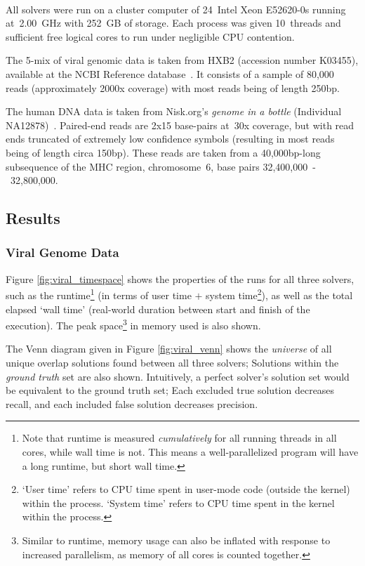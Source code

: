 All solvers were run on a cluster computer of 24~Intel\textsuperscript{\textregistered} Xeon\textsuperscript{\textregistered} E52620-0s running at~2.00~GHz with 252~GB of storage. Each process was given 10~threads and sufficient free logical cores to run under negligible CPU contention.

The 5-mix of viral genomic data is taken from HXB2 (accession number K03455), available at the NCBI Reference database~\cite{ncbi}. It consists of a sample of 80,000 reads (approximately 2000x coverage) with most reads being of length 250bp.

The human DNA data is taken from Nisk.org's \textit{genome in a bottle} (Individual NA12878)~\cite{genomeinabottle}. Paired-end reads are 2x15 base-pairs at~30x coverage, but with \gls{read} ends truncated of extremely low confidence symbols (resulting in most reads being of length circa 150bp). These reads are taken from a 40,000bp-long subsequence of the MHC region, chromosome~6, base pairs 32,400,000~-~32,800,000.

\subsection{Results}\subsubsection{Viral Genome Data}
\label{p3_viral}

Figure \ref{fig:viral_timespace} shows the properties of the runs for all three solvers, such as the runtime\footnote{Note that runtime is measured \textit{cumulatively} for all running threads in all cores, while wall time is not. This means a well-parallelized program will have a long runtime, but short wall time.} (in terms of user time $+$ system time\footnote{`User time' refers to CPU time spent in user-mode code (outside the kernel) within the process. `System time' refers to CPU time spent in the kernel within the process.}), as well as the total elapsed `wall time' (real-world duration between start and finish of the execution). The peak space\footnote{Similar to runtime, memory usage can also be inflated with response to increased parallelism, as memory of all cores is counted together.} in memory used is also shown.

The Venn diagram given in Figure \ref{fig:viral_venn} shows the \textit{universe} of all unique overlap \glspl{solution} found between all three solvers; Solutions within the \textit{ground truth} set are also shown. Intuitively, a perfect solver's solution set would be equivalent to the ground truth set; Each excluded true solution decreases recall, and each included false solution decreases precision. 


